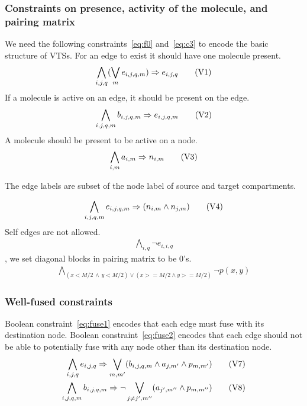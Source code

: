 \subsubsection{Constraints on presence, activity of the molecule, and pairing matrix}
%
We need the following constraints~\eqref{eq:f0} and~\eqref{eq:c3}
to encode the basic structure of VTSs.
%
For an edge to exist it should have one molecule present. 
%
\begin{align}
  \bigwedge\limits_{i,j,q} (\bigvee_m e_{i,j,q,m} )\Rightarrow e_{i,j,q}\tag{V1}\label{eq:f0}
\end{align}
If a molecule is active on an edge, it should be present on the edge.
%
\begin{align}
  \bigwedge\limits_{i,j,q,m} b_{i,j,q,m} \Rightarrow e_{i,j,q,m}\tag{V2}\label{eq:f1}
\end{align}
A molecule should be present to be active on a node.  
\begin{align}
  \bigwedge\limits_{i,m} a_{i,m} \Rightarrow n_{i,m}
  \tag{V3}\label{eq:c4}
\end{align}

The edge labels are subset of the node label of source and target compartments.

\begin{align}
  \bigwedge\limits_{i,j,q,m} e_{i,j,q,m} \Rightarrow (n_{i,m} \land n_{j,m} )\tag{V4}\label{eq:c0}
\end{align}
Self edges are not allowed. 
\begin{align}
   \bigwedge\limits_{i,q} \neg e_{i,i,q}\tag{V5}\label{eq:c2}
\end{align}
,
we set diagonal blocks in pairing matrix to be 0's.
\begin{align}
  \bigwedge\limits_{(x < M/2 \, \land  \, y < M/2) \lor  (x >= M/2 \land y >= M/2)} \neg p(x,y)
  \tag{V6}\label{eq:c3}
\end{align}

\subsubsection{Well-fused constraints}
Boolean constraint~\eqref{eq:fuse1} encodes that each edge must fuse with
its destination node.
%
Boolean constraint~\eqref{eq:fuse2} encodes that each edge should not
be able to potentially fuse with any node other than its destination node.
\begin{align}
  \bigwedge\limits_{i,j,q} e_{i,j,q} \Rightarrow \bigvee_{m,m^{\prime}} (b_{i,j,q,m} \land a_{j,m^{\prime}} \land p_{m,m^{\prime}})
  \tag{V7}\label{eq:fuse1}  \\
\bigwedge\limits_{i,j,q,m} b_{i,j,q,m} \Rightarrow \neg \bigvee_{j \neq j^{\prime}, m^{\prime\prime}} ( a_{j^{\prime},m^{\prime\prime}} \land p_{m,m^{\prime\prime}})
  \tag{V8}\label{eq:fuse2}  
\end{align}


